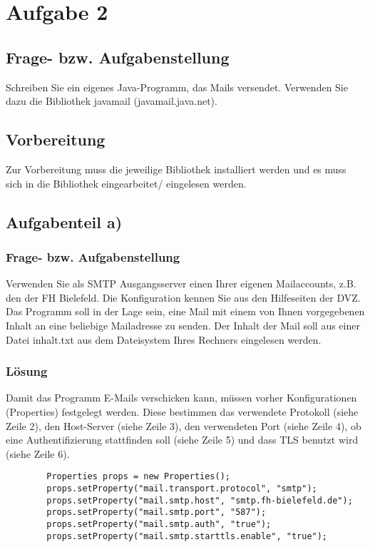 \newcommand{\env}[1]{\texttt{#1}}
\newcommand{\command}[1]{\texttt{#1}}
\newcommand{\package}[1]{\texttt{\itshape#1}}
\newcommand{\engl}[1]{(engl: \textit{#1})\xspace}
\newpage

\section{Aufgabe 2}

\subsection{Frage- bzw. Aufgabenstellung}
Schreiben Sie ein eigenes Java-Programm, das Mails versendet. Verwenden Sie dazu die Bibliothek javamail (javamail.java.net). 

\subsection{Vorbereitung}
Zur Vorbereitung muss die jeweilige Bibliothek installiert werden und es muss sich in die Bibliothek eingearbeitet/ eingelesen werden.

\subsection{Aufgabenteil a)}
\subsubsection{Frage- bzw. Aufgabenstellung}
Verwenden Sie als SMTP Ausgangsserver einen Ihrer eigenen Mailaccounts, z.B. den der FH Bielefeld. Die Konﬁguration kennen Sie aus den Hilfeseiten der DVZ. Das Programm soll in der Lage sein, eine Mail mit einem von Ihnen vorgegebenen Inhalt an eine beliebige Mailadresse zu senden. Der Inhalt der Mail soll aus einer Datei inhalt.txt aus dem Dateisystem Ihres Rechners eingelesen werden.

\subsubsection{Lösung}
Damit das Programm E-Mails verschicken kann, müssen vorher Konfigurationen (Properties) festgelegt werden. Diese bestimmen das verwendete Protokoll (siehe Zeile 2), den Host-Server (siehe Zeile 3), den verwendeten Port (siehe Zeile 4), ob eine Authentifizierung stattfinden soll (siehe Zeile 5) und dass TLS benutzt wird (siehe Zeile 6).
\begin{lstlisting}
		Properties props = new Properties();
		props.setProperty("mail.transport.protocol", "smtp");
		props.setProperty("mail.smtp.host", "smtp.fh-bielefeld.de");
		props.setProperty("mail.smtp.port", "587");
		props.setProperty("mail.smtp.auth", "true");
		props.setProperty("mail.smtp.starttls.enable", "true");
\end{lstlisting}
\\

